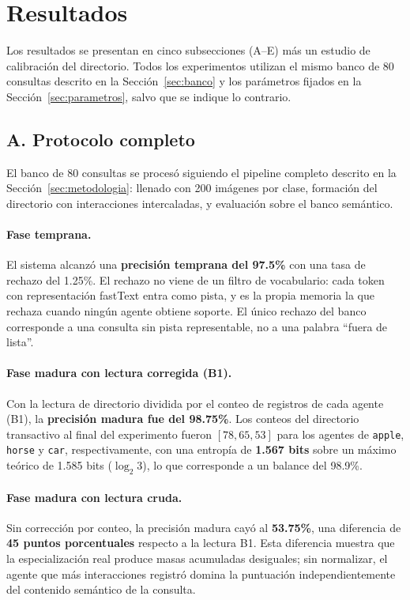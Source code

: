 \section{Resultados}
\label{sec:resultados}

Los resultados se presentan en cinco subsecciones (A--E) más un estudio de calibración del directorio.
Todos los experimentos utilizan el mismo banco de 80 consultas descrito en la Sección~\ref{sec:banco} y los parámetros fijados en la Sección~\ref{sec:parametros}, salvo que se indique lo contrario.

\subsection{A. Protocolo completo}
\label{sec:proto-completo}

El banco de 80 consultas se procesó siguiendo el pipeline completo descrito en la Sección~\ref{sec:metodologia}: llenado con 200 imágenes por clase, formación del directorio con interacciones intercaladas, y evaluación sobre el banco semántico.

\paragraph{Fase temprana.}
El sistema alcanzó una \textbf{precisión temprana del 97.5\%} con una tasa de rechazo del 1.25\%.
El rechazo no viene de un filtro de vocabulario: cada token con representación fastText entra como pista, y es la propia memoria la que rechaza cuando ningún agente obtiene soporte. El único rechazo del banco corresponde a una consulta sin pista representable, no a una palabra ``fuera de lista''.

\paragraph{Fase madura con lectura corregida (B1).}
Con la lectura de directorio dividida por el conteo de registros de cada agente (B1), la \textbf{precisión madura fue del 98.75\%}.
Los conteos del directorio transactivo al final del experimento fueron $[78, 65, 53]$ para los agentes de \texttt{apple}, \texttt{horse} y \texttt{car}, respectivamente, con una entropía de \textbf{1.567 bits} sobre un máximo teórico de 1.585 bits ($\log_2 3$), lo que corresponde a un balance del 98.9\%.

\paragraph{Fase madura con lectura cruda.}
Sin corrección por conteo, la precisión madura cayó al \textbf{53.75\%}, una diferencia de \textbf{45 puntos porcentuales} respecto a la lectura B1.
Esta diferencia muestra que la especialización real produce masas acumuladas desiguales; sin normalizar, el agente que más interacciones registró domina la puntuación independientemente del contenido semántico de la consulta.

